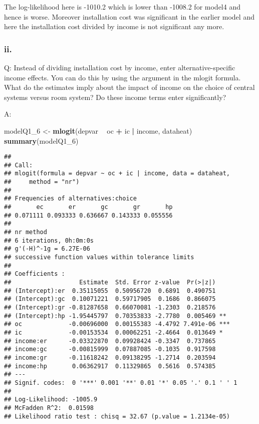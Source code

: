 \documentclass[
]{article}
\newenvironment{Shaded}{\begin{snugshade}}{\end{snugshade}}
\newcommand{\DecValTok}[1]{\textcolor[rgb]{0.00,0.00,0.81}{#1}}
\newcommand{\KeywordTok}[1]{\textcolor[rgb]{0.13,0.29,0.53}{\textbf{#1}}}
\newcommand{\NormalTok}[1]{#1}
\newcommand{\OperatorTok}[1]{\textcolor[rgb]{0.81,0.36,0.00}{\textbf{#1}}}
\newcommand{\StringTok}[1]{\textcolor[rgb]{0.31,0.60,0.02}{#1}}
\begin{document}
The log-likelihood here is -1010.2 which is lower than -1008.2 for
model4 and hence is worse. Moreover installation cost was significant in
the earlier model and here the installation cost divided by income is
not significant any more.

\hypertarget{ii.-2}{%
\subsubsection{ii.}\label{ii.-2}}

Q: Instead of dividing installation cost by income, enter
alternative-specific income effects. You can do this by using the
\texttt{\textbar{}} argument in the mlogit formula. What do the
estimates imply about the impact of income on the choice of central
systems versus room system? Do these income terms enter significantly?

A:

\begin{Shaded}
\begin{Highlighting}[]
\NormalTok{modelQ1_}\DecValTok{6}\NormalTok{ <-}\StringTok{ }\KeywordTok{mlogit}\NormalTok{(depvar }\OperatorTok{~}\StringTok{ }\NormalTok{oc }\OperatorTok{+}\StringTok{ }\NormalTok{ic }\OperatorTok{|}\StringTok{ }\NormalTok{income, dataheat)  }
\KeywordTok{summary}\NormalTok{(modelQ1_}\DecValTok{6}\NormalTok{)}
\end{Highlighting}
\end{Shaded}

\begin{verbatim}
## 
## Call:
## mlogit(formula = depvar ~ oc + ic | income, data = dataheat, 
##     method = "nr")
## 
## Frequencies of alternatives:choice
##       ec       er       gc       gr       hp 
## 0.071111 0.093333 0.636667 0.143333 0.055556 
## 
## nr method
## 6 iterations, 0h:0m:0s 
## g'(-H)^-1g = 6.27E-06 
## successive function values within tolerance limits 
## 
## Coefficients :
##                   Estimate  Std. Error z-value  Pr(>|z|)    
## (Intercept):er  0.35115055  0.50956720  0.6891  0.490751    
## (Intercept):gc  0.10071221  0.59717905  0.1686  0.866075    
## (Intercept):gr -0.81287658  0.66070081 -1.2303  0.218576    
## (Intercept):hp -1.95445797  0.70353833 -2.7780  0.005469 ** 
## oc             -0.00696000  0.00155383 -4.4792 7.491e-06 ***
## ic             -0.00153534  0.00062251 -2.4664  0.013649 *  
## income:er      -0.03322870  0.09928424 -0.3347  0.737865    
## income:gc      -0.00815999  0.07887085 -0.1035  0.917598    
## income:gr      -0.11618242  0.09138295 -1.2714  0.203594    
## income:hp       0.06362917  0.11329865  0.5616  0.574385    
## ---
## Signif. codes:  0 '***' 0.001 '**' 0.01 '*' 0.05 '.' 0.1 ' ' 1
## 
## Log-Likelihood: -1005.9
## McFadden R^2:  0.01598 
## Likelihood ratio test : chisq = 32.67 (p.value = 1.2134e-05)
\end{verbatim}
\end{document}
